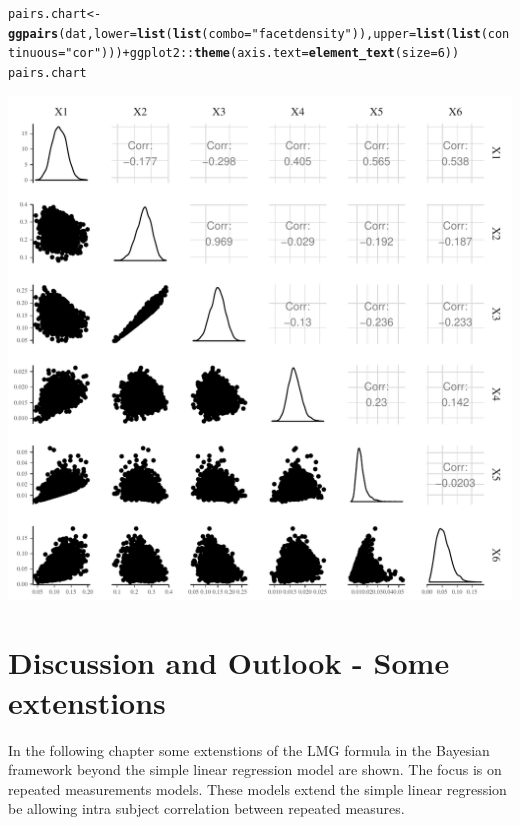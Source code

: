 \documentclass[11pt,a4paper,twoside]{book}\usepackage[]{graphicx}\usepackage[]{color}
\makeatletter
\def\maxwidth{ %
  \ifdim\Gin@nat@width>\linewidth
    \linewidth
  \else
    \Gin@nat@width
  \fi
}
\newcommand{\hlnum}[1]{\textcolor[rgb]{0.686,0.059,0.569}{#1}}%
\newcommand{\hlstr}[1]{\textcolor[rgb]{0.192,0.494,0.8}{#1}}%
\newcommand{\hlopt}[1]{\textcolor[rgb]{0,0,0}{#1}}%
\newcommand{\hlstd}[1]{\textcolor[rgb]{0.345,0.345,0.345}{#1}}%
\newcommand{\hlkwb}[1]{\textcolor[rgb]{0.69,0.353,0.396}{#1}}%
\newcommand{\hlkwc}[1]{\textcolor[rgb]{0.333,0.667,0.333}{#1}}%
\newcommand{\hlkwd}[1]{\textcolor[rgb]{0.737,0.353,0.396}{\textbf{#1}}}%
\newenvironment{kframe}{%
 \def\at@end@of@kframe{}%
 \ifinner\ifhmode%
  \def\at@end@of@kframe{\end{minipage}}%
  \begin{minipage}{\columnwidth}%
 \fi\fi%
 \def\FrameCommand##1{\hskip\@totalleftmargin \hskip-\fboxsep
 \colorbox{shadecolor}{##1}\hskip-\fboxsep
     \hskip-\linewidth \hskip-\@totalleftmargin \hskip\columnwidth}%
 \MakeFramed {\advance\hsize-\width
   \@totalleftmargin\z@ \linewidth\hsize
   \@setminipage}}%
 {\par\unskip\endMakeFramed%
 \at@end@of@kframe}
\newenvironment{knitrout}{}{} %
\makeatother
\begin{document}
\begin{knitrout}
\begin{kframe}
\begin{alltt}
\hlstd{pairs.chart} \hlkwb{<-} \hlkwd{ggpairs}\hlstd{(dat,} \hlkwc{lower} \hlstd{=} \hlkwd{list}\hlstd{(}\hlkwd{list}\hlstd{(}\hlkwc{combo} \hlstd{=} \hlstr{"facetdensity"}\hlstd{)),} \hlkwc{upper} \hlstd{=} \hlkwd{list}\hlstd{(}\hlkwd{list}\hlstd{(}\hlkwc{continuous} \hlstd{=} \hlstr{"cor"}\hlstd{)))} \hlopt{+} \hlstd{ggplot2}\hlopt{::}\hlkwd{theme}\hlstd{(}\hlkwc{axis.text} \hlstd{=} \hlkwd{element_text}\hlstd{(}\hlkwc{size} \hlstd{=} \hlnum{6}\hlstd{))}
\hlstd{pairs.chart}
\end{alltt}
\end{kframe}
\includegraphics[width=\maxwidth]{figure/ch03_figreal_data_LMG-2} 

\end{knitrout}















\chapter{Discussion and Outlook - Some extenstions}

In the following chapter some extenstions of the LMG formula in the Bayesian framework beyond the simple linear regression model are shown. The focus is on repeated measurements models. These models extend the simple linear regression be allowing intra subject correlation between repeated measures. 
\end{document}
